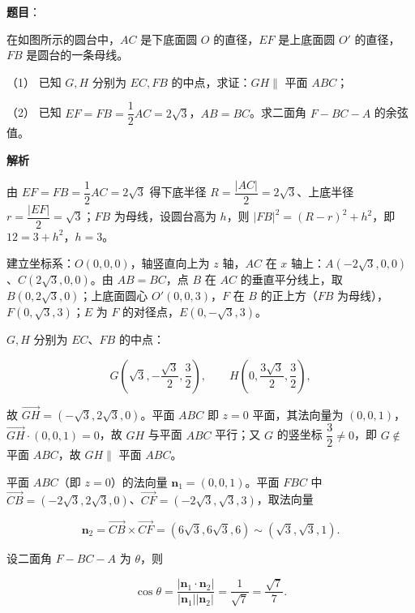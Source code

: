 \begin{answer}

\textbf{题目}：

在如图所示的圆台中，\(AC\) 是下底面圆 \(O\) 的直径，\(EF\) 是上底面圆 \(O'\) 的直径，\(FB\) 是圆台的一条母线。

（1） 已知 \(G,H\) 分别为 \(EC,FB\) 的中点，求证：\(GH\parallel\) 平面 \(ABC\)；

（2） 已知 \(EF=FB=\dfrac{1}{2}AC=2\sqrt{3}\)，\(AB=BC\)。求二面角 \(F-BC-A\) 的余弦值。
\nopagebreak[4]
\begin{center}\end{center}
\nopagebreak[4]
\textbf{解析}

由 \(EF=FB=\dfrac{1}{2}AC=2\sqrt{3}\) 得下底半径 \(R=\dfrac{|AC|}{2}=2\sqrt{3}\)、上底半径 \(r=\dfrac{|EF|}{2}=\sqrt{3}\)；\(FB\) 为母线，设圆台高为 \(h\)，则 \(|FB|^{2}=(R-r)^{2}+h^{2}\)，即 \(12=3+h^{2}\)，\(h=3\)。

建立坐标系：\(O(0,0,0)\)，轴竖直向上为 \(z\) 轴，\(AC\) 在 \(x\) 轴上：\(A\left(-2\sqrt{3},0,0\right)\)、\(C\left(2\sqrt{3},0,0\right)\)。由 \(AB=BC\)，点 \(B\) 在 \(AC\) 的垂直平分线上，取 \(B\left(0,2\sqrt{3},0\right)\)；上底面圆心 \(O'(0,0,3)\)，\(F\) 在 \(B\) 的正上方（\(FB\) 为母线），\(F\left(0,\sqrt{3},3\right)\)；\(E\) 为 \(F\) 的对径点，\(E\left(0,-\sqrt{3},3\right)\)。


\(G,H\) 分别为 \(EC\)、\(FB\) 的中点：

\nopagebreak[4]
\[
G\left(\sqrt{3},-\dfrac{\sqrt{3}}{2},\dfrac{3}{2}\right),\qquad H\left(0,\dfrac{3\sqrt{3}}{2},\dfrac{3}{2}\right),
\]

故 \(\overrightarrow{GH}=\left(-\sqrt{3},2\sqrt{3},0\right)\)。平面 \(ABC\) 即 \(z=0\) 平面，其法向量为 \((0,0,1)\)，\(\overrightarrow{GH}\cdot(0,0,1)=0\)，故 \(GH\) 与平面 \(ABC\) 平行；又 \(G\) 的竖坐标 \(\dfrac{3}{2}\neq 0\)，即 \(G\notin\) 平面 \(ABC\)，故 \(GH\parallel\) 平面 \(ABC\)。


平面 \(ABC\)（即 \(z=0\)）的法向量 \(\boldsymbol{n}_{1}=(0,0,1)\)。平面 \(FBC\) 中 \(\overrightarrow{CB}=\left(-2\sqrt{3},2\sqrt{3},0\right)\)、\(\overrightarrow{CF}=\left(-2\sqrt{3},\sqrt{3},3\right)\)，取法向量

\nopagebreak[4]
\[
\boldsymbol{n}_{2}=\overrightarrow{CB}\times\overrightarrow{CF}=\left(6\sqrt{3},6\sqrt{3},6\right)\sim\left(\sqrt{3},\sqrt{3},1\right).
\]

设二面角 \(F-BC-A\) 为 \(\theta\)，则

\nopagebreak[4]
\[
\cos\theta=\dfrac{|\boldsymbol{n}_{1}\cdot\boldsymbol{n}_{2}|}{|\boldsymbol{n}_{1}||\boldsymbol{n}_{2}|}=\dfrac{1}{\sqrt{7}}=\dfrac{\sqrt{7}}{7}.
\]



\end{answer}
